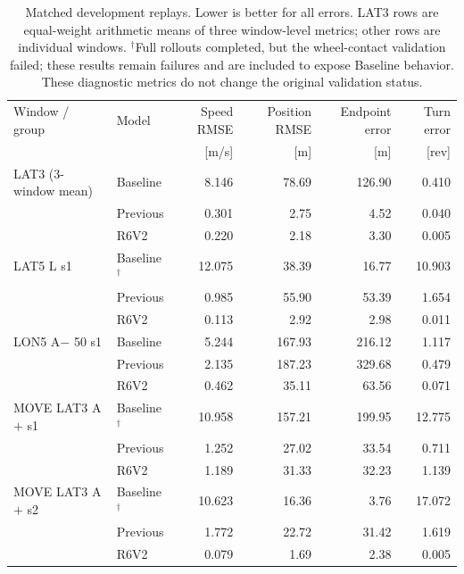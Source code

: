 \begin{table}[t]
\centering\small
\setlength{\tabcolsep}{7pt}
\begin{tabular}{@{}llrrrr@{}}
\toprule
Window / group & Model & Speed RMSE & Position RMSE & Endpoint error & Turn error \\
 & & [m/s] & [m] & [m] & [rev] \\
\midrule
LAT3 (3-window mean) & Baseline & 8.146 & 78.69 & 126.90 & 0.410 \\
 & Previous & 0.301 & 2.75 & 4.52 & 0.040 \\
 & R6V2 & 0.220 & 2.18 & 3.30 & 0.005 \\
\addlinespace[2pt]
LAT5 L s1 & Baseline$^{\dagger}$ & 12.075 & 38.39 & 16.77 & 10.903 \\
 & Previous & 0.985 & 55.90 & 53.39 & 1.654 \\
 & R6V2 & 0.113 & 2.92 & 2.98 & 0.011 \\
\addlinespace[2pt]
LON5 A$-$ 50 s1 & Baseline & 5.244 & 167.93 & 216.12 & 1.117 \\
 & Previous & 2.135 & 187.23 & 329.68 & 0.479 \\
 & R6V2 & 0.462 & 35.11 & 63.56 & 0.071 \\
\addlinespace[2pt]
MOVE LAT3 A$+$ s1 & Baseline$^{\dagger}$ & 10.958 & 157.21 & 199.95 & 12.775 \\
 & Previous & 1.252 & 27.02 & 33.54 & 0.711 \\
 & R6V2 & 1.189 & 31.33 & 32.23 & 1.139 \\
\addlinespace[2pt]
MOVE LAT3 A$+$ s2 & Baseline$^{\dagger}$ & 10.623 & 16.36 & 3.76 & 17.072 \\
 & Previous & 1.772 & 22.72 & 31.42 & 1.619 \\
 & R6V2 & 0.079 & 1.69 & 2.38 & 0.005 \\
\bottomrule
\end{tabular}
\caption{Matched development replays. Lower is better for all errors. LAT3 rows are equal-weight arithmetic means of three window-level metrics; other rows are individual windows. $^{\dagger}$Full rollouts completed, but the wheel-contact validation failed; these results remain failures and are included to expose Baseline behavior. These diagnostic metrics do not change the original validation status.}
\label{tab:exp_results}
\end{table}
